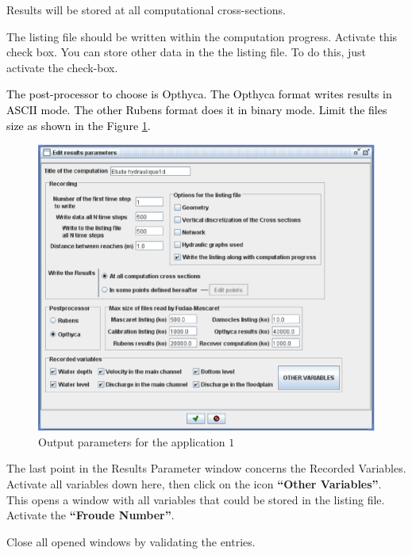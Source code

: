 \documentclass[a4paper,12pt]{article}
\begin{document}
Results will be stored at all computational cross-sections.

\vspace{0.5cm}

The listing file should be written within the computation progress. Activate
this check box. You can store other data in the the listing
file. To do this, just activate the check-box.

\textcolor{black}{The post-processor to choose is Opthyca. The Opthyca format writes results in ASCII mode. The other Rubens format does it in binary mode.
Limit the files size as shown in the Figure \ref{fig:Output-para1}.}

\begin{figure}[h]
  \begin{center}
  \includegraphics[scale=0.5]{output_para}
  \caption{Output parameters for the application $1$}
  \label{fig:Output-para1}
  \end{center}
\end{figure}

The last point in the Results Parameter window concerns the Recorded
Variables. Activate all variables down here, then click on the icon
\textbf{{}``Other Variables''}. This opens a window with all variables
that could be stored in the listing file. Activate the \textbf{{}``Froude
Number''}.

\vspace{0.5cm}

Close all opened windows by validating the entries.
\end{document}

